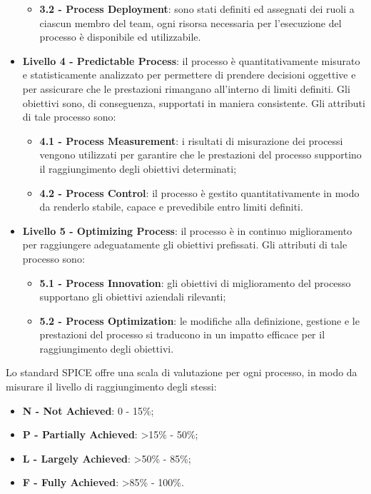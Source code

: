 \begin{itemize}
\begin{itemize}
		\item \textbf{3.2 - Process Deployment}: sono stati definiti ed assegnati dei ruoli a ciascun membro del team, ogni risorsa necessaria per l'esecuzione del processo è disponibile ed utilizzabile.
	\end{itemize}
	\item \textbf {Livello 4 - Predictable Process}: il processo è quantitativamente misurato e statisticamente analizzato per permettere di prendere decisioni oggettive e per assicurare che le prestazioni rimangano all'interno di limiti definiti. Gli obiettivi sono, di conseguenza, supportati in maniera consistente. Gli attributi di tale processo sono:
	\begin{itemize}
		\item \textbf{4.1 - Process Measurement}: i risultati di misurazione dei processi vengono utilizzati per garantire che le prestazioni del processo supportino il raggiungimento degli obiettivi determinati;
		\item \textbf{4.2 - Process Control}: il processo è gestito quantitativamente in modo da renderlo stabile, capace e prevedibile entro limiti definiti.
	\end{itemize}
	\item \textbf {Livello 5 - Optimizing Process}: il processo è in continuo miglioramento per raggiungere adeguatamente gli obiettivi prefissati. Gli attributi di tale processo sono:
	\begin{itemize}
		\item \textbf{5.1 - Process Innovation}: gli obiettivi di miglioramento del processo supportano gli obiettivi aziendali rilevanti;
		\item \textbf{5.2 - Process Optimization}: le modifiche alla definizione, gestione e le prestazioni del processo si traducono in un impatto efficace per il raggiungimento degli obiettivi.
	\end{itemize}
\end{itemize}

Lo standard SPICE offre una scala di valutazione per ogni processo, in modo da misurare il livello di raggiungimento degli stessi:
\begin{itemize}
	\item \textbf{N - Not Achieved}: 0 - 15\%;
	\item \textbf{P - Partially Achieved}: >15\% - 50\%;
	\item \textbf{L - Largely Achieved}: >50\% - 85\%;
	\item \textbf{F - Fully Achieved}: >85\% - 100\%.
\end{itemize}

